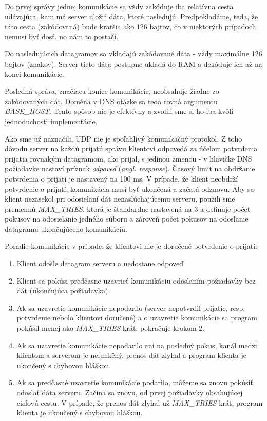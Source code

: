 \documentclass[a4paper]{article}
\begin{document}
  Do prvej správy jednej komunikácie sa vždy zakóduje iba relatívna cesta
  udávajúca, kam má server uložiť dáta, ktoré nasledujú. Predpokladáme, teda,
  že táto cesta (zakódovaná) bude kratšia ako 126 bajtov, čo v niektorých
  prípadoch nemusí byť dosť, no nám to postačí.

  Do nasledujúcich datagramov sa vkladajú zakódované dáta - vždy maximálne 126
  bajtov (znakov). Server tieto dáta postupne ukladá do RAM a dekóduje ich až
  na konci komunikácie.

  Posledná správa, značiaca koniec komunikácie, neobsahuje žiadne zo
  zakódovaných dát. Doména v DNS otázke sa teda rovná argumentu
  \textit{BASE\_HOST}. Tento spôsob nie je efektívny a zvolili sme si ho iba
  kvôli jednoduchosti implementácie.

  Ako sme už naznačili, UDP nie je spoľahlivý komunikačný protokol. Z toho
  dôvodu server na každú prijatú správu klientovi odpovedá za účelom potvrdenia
  prijatia rovnakým datagramom, ako prijal, s jedinou zmenou - v hlavičke DNS
  požiadavke nastaví príznak \textit{odpoveď} (\textit{angl. response}). Časový
  limit na obdržanie potvrdenia o prijatí je nastavený na 100 ms. V prípade, že
  klient neobdrží potvrdenie o prijatí, komunikácia musí byť ukončená a začatá
  odznovu. Aby sa klient nezasekol pri odosielaní dát nenaslúchajúcemu serveru,
  použili sme premennú \textit{MAX\_TRIES}, ktorá je štandardne nastavená na 3
  a definuje počet pokusov na odosielanie jedného súboru a zároveň počet
  pokusov na odoslanie datagramu ukončujúceho komunikáciu.

  \begin{samepage}
    Poradie komunikácie v prípade, že klientovi nie je doručené potvrdenie o prijatí:
  \begin{enumerate}
    \item Klient odošle datagram serveru a nedostane odpoveď
    \item Klient sa pokúsi predčasne uzavrieť komunikáciu odoslaním požiadavky
      bez dát (ukončujúca požiadavka)
    \item Ak sa uzavretie komunikácie nepodarilo (server nepotvrdil prijatie,
      resp. potvrdenie nebolo klientovi doručené) a o uzavretie komunikácie sa
      program pokúsil menej ako \textit{MAX\_TRIES} krát, pokračuje krokom 2.
    \item Ak sa uzavretie komunikácie nepodarilo ani na posledný pokus, kanál
      medzi klientom a serverom je nefunkčný, prenos dát zlyhal a program
      klienta je ukončený s chybovou hláškou.
    \item Ak sa predčasné uzavretie komunikácie podarilo, môžeme sa znovu
      pokúsiť odoslať dáta serveru. Začína sa znovu, od prvej požiadavky
      obsahujúcej cieľovú cestu. V prípade, že prenos dát zlyhal už
      \textit{MAX\_TRIES} krát, program klienta je ukončený s chybovou hláškou.
  \end{enumerate}
  \end{samepage}
      
\end{document}
